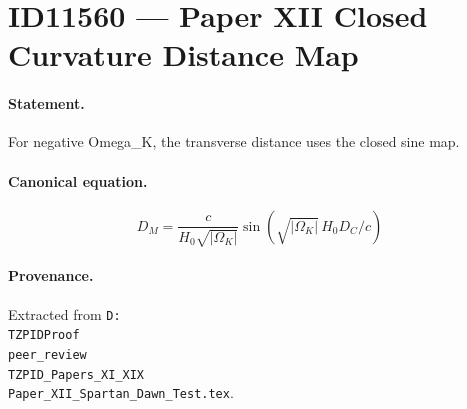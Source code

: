 \section*{ID11560 --- Paper XII Closed Curvature Distance Map}

\paragraph{Statement.}
For negative Omega_K, the transverse distance uses the closed sine map.

\paragraph{Canonical equation.}
\[
D_M=\frac{c}{H_0\sqrt{|\Omega_K|}}\sin\!\left(\sqrt{|\Omega_K|}\,H_0D_C/c\right)
\]

\paragraph{Provenance.}
Extracted from \texttt{D:\\TZPIDProof\\peer\_review\\TZPID\_Papers\_XI\_XIX\\Paper\_XII\_Spartan\_Dawn\_Test.tex}.
